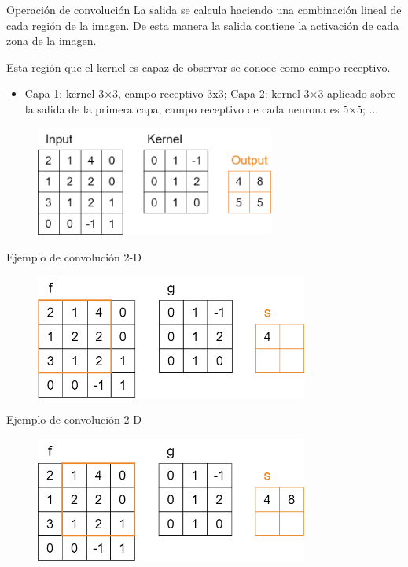 \begin{frame}{Operación de convolución}
La salida se calcula  haciendo una \alert{combinación lineal} de cada región de la imagen. De esta manera la salida contiene la activación de cada zona de la imagen.

Esta región que el \alert{kernel} es capaz de \alert{observar} se conoce como \alert{campo receptivo}.

\begin{itemize}
    \item Capa 1: kernel 3×3, campo receptivo 3x3; Capa 2: kernel 3×3 aplicado sobre la salida de la primera capa, campo receptivo de cada neurona es 5×5; ...
\end{itemize}

\begin{figure}
    \centering
    \includegraphics[width=0.7\textwidth]{Slides/figures/Tema 3/Convolucion2D_2.png}
\end{figure}
\end{frame}


\begin{frame}{Ejemplo de convolución 2-D}
\begin{figure}
    \centering
    \includegraphics[width=0.8\textwidth]{Slides/figures/Tema 2/Convolucion2D_2.png}
\end{figure}
\end{frame}

\begin{frame}{Ejemplo de convolución 2-D}
\begin{figure}
    \centering
    \includegraphics[width=0.8\textwidth]{Slides/figures/Tema 2/Convolucion2D_3.png}
\end{figure}
\end{frame}


